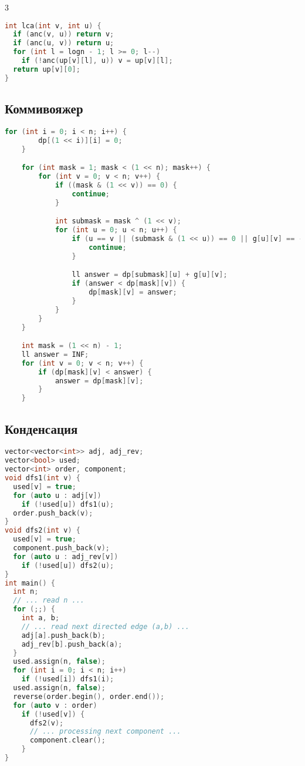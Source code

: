 \documentclass[10pt,a4paper,landscape,twosided]{extarticle}
\begin{document}
\begin{multicols}{3}
\begin{lstlisting}[language=C++]
int lca(int v, int u) {
  if (anc(v, u)) return v;
  if (anc(u, v)) return u;
  for (int l = logn - 1; l >= 0; l--)
    if (!anc(up[v][l], u)) v = up[v][l];
  return up[v][0];
}
\end{lstlisting}

\subsection{Коммивояжер}
\begin{lstlisting}[language=C++]
for (int i = 0; i < n; i++) {
        dp[(1 << i)][i] = 0;
    }

    for (int mask = 1; mask < (1 << n); mask++) {
        for (int v = 0; v < n; v++) {
            if ((mask & (1 << v)) == 0) {
                continue;
            }

            int submask = mask ^ (1 << v);
            for (int u = 0; u < n; u++) {
                if (u == v || (submask & (1 << u)) == 0 || g[u][v] == -1) {
                    continue;
                }

                ll answer = dp[submask][u] + g[u][v];
                if (answer < dp[mask][v]) {
                    dp[mask][v] = answer;
                }
            }
        }
    }

    int mask = (1 << n) - 1;
    ll answer = INF;
    for (int v = 0; v < n; v++) {
        if (dp[mask][v] < answer) {
            answer = dp[mask][v];
        }
    }
\end{lstlisting}

\subsection{Конденсация}
\begin{lstlisting}[language=C++]
vector<vector<int>> adj, adj_rev;
vector<bool> used;
vector<int> order, component;
void dfs1(int v) {
  used[v] = true;
  for (auto u : adj[v])
    if (!used[u]) dfs1(u);
  order.push_back(v);
}
void dfs2(int v) {
  used[v] = true;
  component.push_back(v);
  for (auto u : adj_rev[v])
    if (!used[u]) dfs2(u);
}
int main() {
  int n;
  // ... read n ...
  for (;;) {
    int a, b;
    // ... read next directed edge (a,b) ...
    adj[a].push_back(b);
    adj_rev[b].push_back(a);
  }
  used.assign(n, false);
  for (int i = 0; i < n; i++)
    if (!used[i]) dfs1(i);
  used.assign(n, false);
  reverse(order.begin(), order.end());
  for (auto v : order)
    if (!used[v]) {
      dfs2(v);
      // ... processing next component ...
      component.clear();
    }
}
\end{lstlisting}


\end{multicols}
\end{document}
